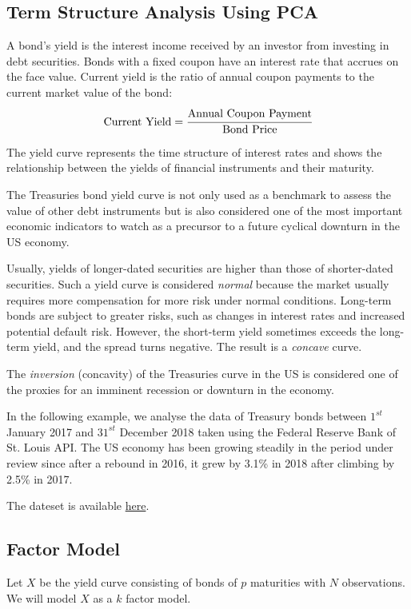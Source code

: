 
\subsection{Term Structure Analysis Using PCA}

A bond’s yield is the interest income received by an investor from investing in debt securities. Bonds with a fixed coupon have an interest rate that accrues on the face value.
Current yield is the ratio of annual coupon payments to the current market value of the bond:
\begin{equation}
\text{Current Yield} = \cfrac{\text{Annual Coupon Payment}}{\text{Bond Price}}
\end{equation}

The yield curve represents the time structure of interest rates and shows the relationship between the yields of financial instruments and their maturity.

The Treasuries bond yield curve is not only used as a benchmark to assess the value of other debt instruments but is also considered one of the most important economic indicators to watch as a precursor to a future cyclical downturn in the US economy.

Usually, yields of longer-dated securities are higher than those of shorter-dated securities. Such a yield curve is considered \emph{normal} because the market usually requires more compensation for more risk under normal conditions. Long-term bonds are subject to greater risks, such as changes in interest rates and increased potential default risk.
However, the short-term yield sometimes exceeds the long-term yield, and the spread turns negative. The result is a \emph{concave} curve.

The \emph{inversion} (concavity) of the Treasuries curve in the US is considered one of the proxies for an imminent recession or downturn in the economy.

In the following example, we analyse the data of Treasury bonds between $1^{st}$ January 2017 and $31^{st}$ December 2018 taken using the Federal Reserve Bank of St. Louis API.
The US economy has been growing steadily in the period under review since after a rebound in 2016, it grew by 3.1\% in 2018 after climbing by 2.5\% in 2017.

The dateset is available \href{https://github.com/matteosan1/finance_course/raw/develop/input_files/DGS_2017_2018.csv"}{here}.

\subsection{Factor Model}
Let $X$ be the yield curve consisting of bonds of $p$ maturities with $N$ observations. We will model $X$ as a $k$ factor model.


